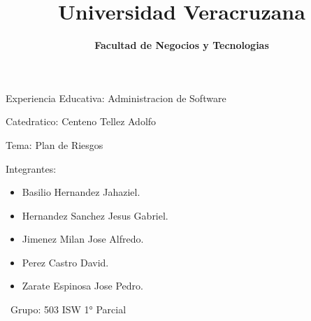 \documentclass[40pt]{article}
\title{\textbf{Universidad Veracruzana} }
\date{\textbf{Facultad de Negocios y Tecnologias} }
\begin{document}
\maketitle
\textsf{\Large Experiencia Educativa: Administracion de Software \\}
 
\maketitle
\textsf{\Large Catedratico: Centeno Tellez Adolfo \\}

\maketitle
\textsf{\Large Tema: Plan de Riesgos \\}

\maketitle
\textsf{\Large Integrantes: \\}
\begin{itemize}
    \item Basilio Hernandez Jahaziel.
    \item Hernandez Sanchez Jesus Gabriel.
    \item Jimenez Milan Jose Alfredo.
    \item Perez Castro David.
    \item Zarate Espinosa Jose Pedro.   
\end{itemize}

\maketitle
\textsf{\ Grupo: 503 ISW 1° Parcial \\}
\end{document}

